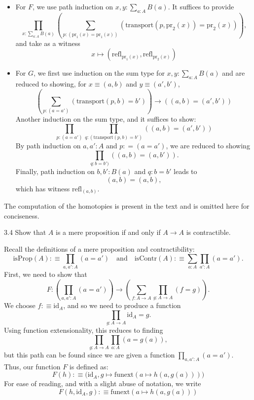 \documentclass[14pt]{extarticle}
\newcommand{\0}{{\mathbf 0}}
\newcommand{\1}{{\mathbf 1}}
\newcommand{\2}{{\mathbf 2}}
\newcommand{\mt}{\mapsto}
\newcommand{\refl}{\mathrm{refl}}
\newcommand{\pr}{\mathrm{pr}}
\newcommand{\id}{\mathrm{id}}
\newcommand{\tr}{\mathrm{transport}}
\newcommand{\isProp}{\mathrm{isProp}}
\newcommand{\isContr}{\mathrm{isContr}}
\newcommand{\funext}{\mathrm{funext}}
\begin{document}
\begin{itemize}
\item For $F$, we use path induction on $x,y : \sum_{a:A}B(a)$. It suffices to provide 
\[\prod_{x:\sum_{a:A}B(a)}\left(\sum_{p:(\pr_1(x) = \pr_1(x))} (\tr(p,\pr_2(x)) = \pr_2(x)) \right),\] and take as a witness
\[x \mt (\refl_{\pr_1(x)}, \refl_{\pr_2(x)})\]

\item For $G$, we first use induction on the sum type for $x,y : \sum_{a:A}B(a)$ and are reduced to showing, for $x \equiv (a,b)$ and $y \equiv (a',b')$,
\[\left(\sum_{p:(a = a')} (\tr(p,b) = b') \right) \to \left((a,b) = (a',b')\right)\]
Another induction on the sum type, and it suffices to show:
\[\prod_{p:(a = a')} \prod_{q :(\tr(p,b) = b')} \left((a,b) = (a',b')\right)\]
By path induction on $a,a':A$ and $p : = (a = a')$, we are reduced to showing
\[\prod_{q : b = b')} \left((a,b) = (a,b')\right).\] Finally, path induction on $b,b' : B(a)$ and $q : b = b'$ leads to
\[(a,b) = (a,b),\] which has witness $\refl_{(a,b)}$.
\end{itemize}
The computation of the homotopies is present in the text and is omitted here for conciseness.


\begin{prob}{3.4}{}
Show that $A$ is a mere proposition if and only if $A \to A$ is contractible.
\end{prob}
Recall the definitions of a mere proposition and contractibility:
\[\isProp(A) :\equiv \prod_{a,a' : A}(a=a') \quad \text{and} \quad \isContr(A):\equiv \sum_{a:A}\prod_{a':A}(a = a').\] First, we need to show that
\[F : \left(\prod_{a,a' : A}(a=a') \right) \to  \left(\sum_{f:A \to A}\prod_{g:A \to A}(f = g) \right).\] We choose $f :\equiv \id_A$, and so we need to produce a function \[\prod_{g : A \to A} \id_A = g.\] Using function extensionality, this reduces to finding
\[\prod_{g : A \to A}\prod_{a : A} (a = g(a)),\] but this path can be found since we are given a function $\prod_{a,a' : A}(a=a')$. Thus, our function $F$ is defined as:
\[F(h) : \equiv \Big(\id_A, g \mt \funext(a \mt h(a,g(a)))\Big)\]
For ease of reading, and with a slight abuse of notation, we write
\[F(h,\id_A,g) :\equiv \funext(a \mt h(a,g(a)))\]
\end{document}
